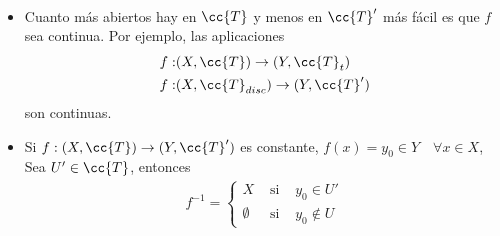 \begin{observacion}\
    \begin{itemize}
        \item Cuanto más abiertos hay en $\cc{T}$ y menos en $\cc{T}'$ más fácil es que $f$ sea continua. Por ejemplo, las aplicaciones  
        \begin{align*}
            f:&(X, \cc{T})\to (Y, \cc{T}_t)\\
            f:&(X, \cc{T}_{disc})\to (Y, \cc{T}')
        \end{align*}
        son continuas.

        \item Si $f:(X, \cc{T})\to (Y, \cc{T}')$ es constante, $f(x)=y_0\in Y$\ \ $\forall x \in X$, Sea $U'\in \cc{T}$, entonces
        \begin{gather*}
            f^{-1}=\left\{
            \begin{array}{ccc}
                X & \text{ si }& y_0\in U'\\
                \emptyset & \text{ si } & y_0\notin U
            \end{array}
            \right.
        \end{gather*}


\end{itemize}
\end{observacion}
